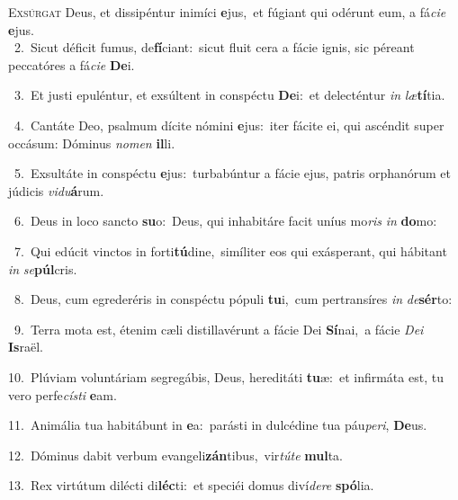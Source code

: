 \lettrine{\initial\textcolor{\initialcolor}{E}}{xsúrgat} Deus, et dissipéntur inimíci \textbf{e}\-jus,~\star et fúgiant qui odérunt eum, a fá\-\textit{ci}\-\textit{e} \textbf{e}\-jus.\\
{\numbfont\textcolor{\numbcolor}{~2.}}~Sicut déficit fumus, de\-\textbf{fí}\-ciant:~\star sicut fluit cera a fácie ignis, sic péreant peccatóres a fá\-\textit{ci}\-\textit{e} \textbf{De}\-i.\par
{\numbfont\textcolor{\numbcolor}{~3.}}~Et justi epuléntur, et exsúltent in conspéctu \textbf{De}\-i:~\star et delecténtur \textit{in} \textit{læ}\-\textbf{tí}tia.\par
{\numbfont\textcolor{\numbcolor}{~4.}}~Cantáte Deo, psalmum dícite nómini \textbf{e}\-jus:~\star iter fácite ei, qui ascéndit super occásum: Dóminus \textit{no}\-\textit{men} \textbf{il}\-li.\par
{\numbfont\textcolor{\numbcolor}{~5.}}~Exsultáte in conspéctu \textbf{e}\-jus:~\star turbabúntur a fácie ejus, patris orphanórum et júdicis \textit{vi}\-\textit{du}\textbf{á}rum.\par
{\numbfont\textcolor{\numbcolor}{~6.}}~Deus in loco sancto \textbf{su}\-o:~\star Deus, qui inhabitáre facit uníus mo\textit{ris} \textit{in} \textbf{do}\-mo:\par
{\numbfont\textcolor{\numbcolor}{~7.}}~Qui edúcit vinctos in forti\-\textbf{tú}\-dine,~\star simíliter eos qui exásperant, qui hábitant \textit{in} \textit{se}\-\textbf{púl}cris.\par
{\numbfont\textcolor{\numbcolor}{~8.}}~Deus, cum egrederéris in conspéctu pópuli \textbf{tu}\-i,~\star cum pertransíres \textit{in} \textit{de}\-\textbf{sér}to:\par
{\numbfont\textcolor{\numbcolor}{~9.}}~Terra mota est, étenim cæli distillavérunt a fácie Dei \textbf{Sí}\-nai,~\star a fácie \textit{De}\-\textit{i} \textbf{Is}\-raël.\par
{\numbfont\textcolor{\numbcolor}{10.}}~Plúviam voluntáriam segregábis, Deus, hereditáti \textbf{tu}\-æ:~\star et infirmáta est, tu vero perfe\-\textit{cís}\-\textit{ti} \textbf{e}\-am.\par
{\numbfont\textcolor{\numbcolor}{11.}}~Animália tua habitábunt in \textbf{e}\-a:~\star parásti in dulcédine tua páu\-\textit{pe}\-\textit{ri}, \textbf{De}\-us.\par
{\numbfont\textcolor{\numbcolor}{12.}}~Dóminus dabit verbum evangeli\-\textbf{zán}\-tibus,~\star vir\-\textit{tú}\-\textit{te} \textbf{mul}\-ta.\par
{\numbfont\textcolor{\numbcolor}{13.}}~Rex virtútum dilécti di\-\textbf{léc}\-ti:~\star et speciéi domus diví\-\textit{de}\-\textit{re} \textbf{spó}\-lia.\par
